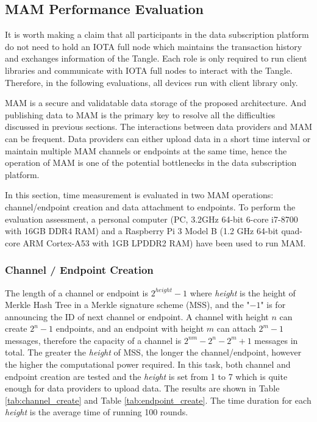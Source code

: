 \documentclass[conference]{IEEEtran}
\begin{document}
\subsection{MAM Performance Evaluation}
\label{section:mam_performance}
It is worth making a claim that all participants in the data subscription platform do not need to hold an IOTA full node which maintains the transaction history and exchanges information of the Tangle. Each role is only required to run client libraries and communicate with IOTA full nodes to interact with the Tangle. Therefore, in the following evaluations, all devices run with client library only.

MAM is a secure and validatable data storage of the proposed architecture. And publishing data to MAM is the primary key to resolve all the difficulties discussed in previous sections. The interactions between data providers and MAM can be frequent. Data providers can either upload data in a short time interval or maintain multiple MAM channels or endpoints at the same time, hence the operation of MAM is one of the potential bottlenecks in the data subscription platform.

In this section, time measurement is evaluated in two MAM operations: channel/endpoint creation and data attachment to endpoints. To perform the evaluation assessment, a personal computer (PC, 3.2GHz 64-bit 6-core i7-8700 with 16GB DDR4 RAM) and a Raspberry Pi 3 Model B (1.2 GHz 64-bit quad-core ARM Cortex-A53 with 1GB LPDDR2 RAM) have been used to run MAM.

\subsubsection{Channel / Endpoint Creation}
The length of a channel or endpoint is $2^{height}-1$ where \textit{height} is the height of Merkle Hash Tree in a Merkle signature scheme (MSS), and the "$-1$" is for announcing the ID of next channel or endpoint. A channel with height $n$ can create $2^n-1$ endpoints, and an endpoint with height $m$ can attach $2^m-1$ messages, therefore the capacity of a channel is $2^{nm}-2^n-2^m+1$ messages in total. The greater the \textit{height} of MSS, the longer the channel/endpoint, however the higher the computational power required. In this task, both channel and endpoint creation are tested and the \textit{height} is set from 1 to 7 which is quite enough for data providers to upload data. The results are shown in Table \ref{tab:channel_create} and Table \ref{tab:endpoint_create}. The time duration for each \textit{height} is the average time of running 100 rounds.
\end{document}
